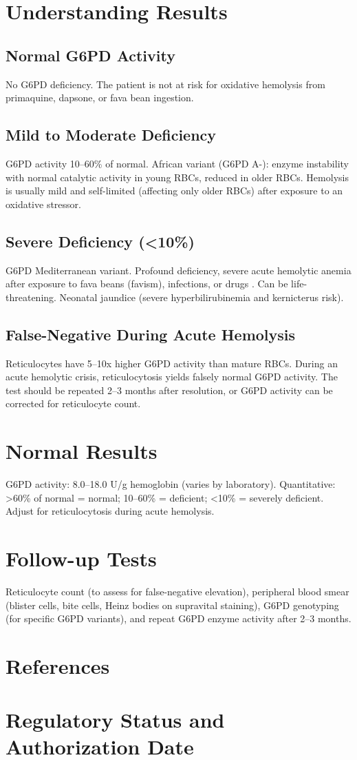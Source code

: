 \section*{Understanding Results}
\subsection*{Normal G6PD Activity}
No G6PD deficiency. The patient is not at risk for oxidative hemolysis from primaquine, dapsone, or fava bean ingestion.
\subsection*{Mild to Moderate Deficiency}
G6PD activity 10--60\% of normal. African variant (G6PD A-): enzyme instability with normal catalytic activity in young RBCs, reduced in older RBCs. Hemolysis is usually mild and self-limited (affecting only older RBCs) after exposure to an oxidative stressor.
\subsection*{Severe Deficiency (<10\%)}
G6PD Mediterranean variant. Profound deficiency, severe acute hemolytic anemia after exposure to fava beans (favism), infections, or drugs \cite{cappellini2008glucose}. Can be life-threatening. Neonatal jaundice (severe hyperbilirubinemia and kernicterus risk).
\subsection*{False-Negative During Acute Hemolysis}
Reticulocytes have 5--10x higher G6PD activity than mature RBCs. During an acute hemolytic crisis, reticulocytosis yields falsely normal G6PD activity. The test should be repeated 2--3 months after resolution, or G6PD activity can be corrected for reticulocyte count.
\section*{Normal Results}
G6PD activity: 8.0--18.0 U/g hemoglobin (varies by laboratory). Quantitative: >60\% of normal = normal; 10--60\% = deficient; <10\% = severely deficient. Adjust for reticulocytosis during acute hemolysis.
\section*{Follow-up Tests}
Reticulocyte count (to assess for false-negative elevation), peripheral blood smear (blister cells, bite cells, Heinz bodies on supravital staining), G6PD genotyping (for specific G6PD variants), and repeat G6PD enzyme activity after 2--3 months.
\section*{References}


\clearpage
\section*{Regulatory Status and Authorization Date}

\clearpage
